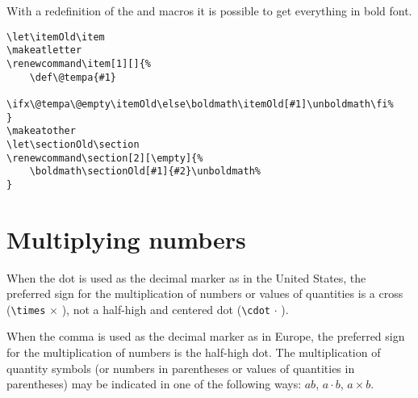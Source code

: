 \begin{table}[htb]
\medskip
With a redefinition of the  and 
 macros it is possible to get everything in bold font.

\medskip
{}


\medskip
\begin{lstlisting}
\let\itemOld\item
\makeatletter
\renewcommand\item[1][]{%
    \def\@tempa{#1}
    \ifx\@tempa\@empty\itemOld\else\boldmath\itemOld[#1]\unboldmath\fi%
}
\makeatother
\let\sectionOld\section
\renewcommand\section[2][\empty]{%
	\boldmath\sectionOld[#1]{#2}\unboldmath%
}
\end{lstlisting}

\section{Multiplying numbers}
When the dot is used as the decimal marker as in the United States, the preferred sign
for the multiplication of
numbers or values of quantities is a cross (\verb|\times| $\times$ ), not a half-high and
centered dot (\verb|\cdot| $\cdot$ ).

When the comma is used as the decimal marker as in Europe, the preferred sign for the
multiplication of
numbers is the half-high dot. The multiplication of quantity symbols (or numbers in
parentheses or values of
quantities in parentheses) may be indicated in one of the following ways: $ab$,
$a\cdot b$, $a\times b$.


\end{table}
